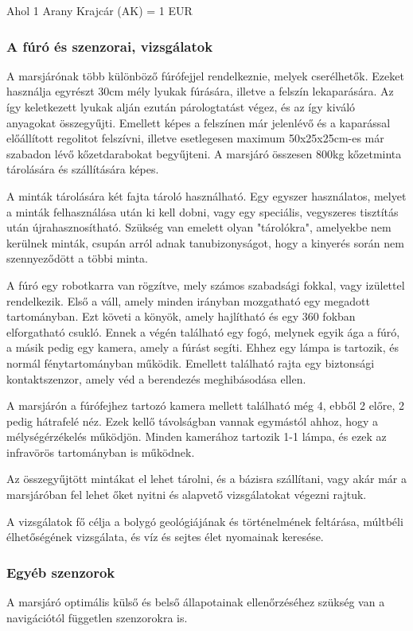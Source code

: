 \documentclass[12pt]{report}
\begin{document}
Ahol 1 Arany Krajcár (AK) = 1 EUR

\subsubsection{A fúró és szenzorai, vizsgálatok}

A marsjárónak több különböző fúrófejjel rendelkeznie, melyek cserélhetők. Ezeket használja egyrészt 30cm mély lyukak fúrására, illetve a felszín lekaparására. Az így keletkezett lyukak alján ezután párologtatást végez, és az így kiváló anyagokat összegyűjti. Emellett képes a felszínen már jelenlévő és a kaparással előállított regolitot felszívni, illetve esetlegesen maximum 50x25x25cm-es már szabadon lévő kőzetdarabokat begyűjteni. A marsjáró összesen 800kg kőzetminta tárolására és szállítására képes.

A minták tárolására két fajta tároló használható. Egy egyszer használatos, melyet a minták felhasználása után ki kell dobni, vagy egy speciális, vegyszeres tisztítás után újrahasznosítható. Szükség van emelett olyan "tárolókra", amelyekbe nem kerülnek minták, csupán arról adnak tanubizonyságot, hogy a kinyerés során nem szennyeződött a többi minta.

A fúró egy robotkarra van rögzítve, mely számos szabadsági fokkal, vagy izülettel rendelkezik. Első a váll, amely minden irányban mozgatható egy megadott tartományban. Ezt követi a könyök, amely hajlítható és egy 360 fokban elforgatható csukló. Ennek a végén található egy fogó, melynek egyik ága a fúró, a másik pedig egy kamera, amely a fúrást segíti. Ehhez egy lámpa is tartozik, és normál fénytartományban működik. Emellett található rajta egy biztonsági kontaktszenzor, amely véd a berendezés meghibásodása ellen.

A marsjárón a fúrófejhez tartozó kamera mellett található még 4, ebből 2 előre, 2 pedig hátrafelé néz. Ezek kellő távolságban vannak egymástól ahhoz, hogy a mélységérzékelés működjön. Minden kamerához tartozik 1-1 lámpa, és ezek az infravörös tartományban is működnek.

Az összegyűjtött mintákat el lehet tárolni, és a bázisra szállítani, vagy akár már a marsjáróban fel lehet őket nyitni és alapvető vizsgálatokat végezni rajtuk.

A vizsgálatok fő célja a bolygó geológiájának és történelmének feltárása, múltbéli élhetőségének vizsgálata, és víz és sejtes élet nyomainak keresése.

\subsubsection{Egyéb szenzorok}
A marsjáró optimális külső és belső állapotainak ellenőrzéséhez szükség van a navigációtól független szenzorokra is.
\end{document}
